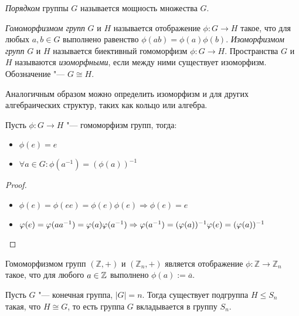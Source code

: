 \begin{definition}
	\textit{Порядком} группы $G$ называется мощность множества $G$.
\end{definition}

\begin{definition}
	\textit{Гомоморфизмом групп} $G$ и $H$ называется отображение $\phi : G \rightarrow H$ такое, что для любых $a,b \in G$ выполнено равенство $\phi(ab) = \phi(a)\phi(b)$. \textit{Изоморфизмом групп} $G$ и $H$ называется биективный гомоморфизм $\phi : G \rightarrow H$. Пространства $G$ и $H$ называются \textit{изоморфными}, если между ними существует изоморфизм. Обозначение "--- $G \cong H$.
\end{definition}

\begin{note}
	Аналогичным образом можно определить изоморфизм и для других алгебраических структур, таких как кольцо или алгебра.
\end{note}

\begin{proposition}
	Пусть $\phi: G \rightarrow H$ "--- гомоморфизм групп, тогда:
	\begin{itemize}
		\item $\phi(e) = e$
		\item $\forall a \in G: \phi(a^{-1}) = (\phi(a))^{-1}$
	\end{itemize}
\end{proposition}

\begin{proof}~
	\begin{itemize}
		\item $\phi(e) = \phi(ee) = \phi(e)\phi(e) \Rightarrow \phi(e) = e$
		\item $\phi(e) = \phi(aa^{-1}) = \phi(a)\phi(a^{-1}) \Rightarrow \phi(a^{-1}) = (\phi(a))^{-1}\phi(e) \hm{=} (\phi(a))^{-1}$\qedhere
	\end{itemize}
\end{proof}

\begin{example}
	Гомоморфизмом групп $(\mathbb{Z}, +)$ и $(\mathbb{Z}_n, +)$ является отображение $\phi: \mathbb{Z} \rightarrow \mathbb{Z}_n$ такое, что для любого $a \in \mathbb{Z}$ выполнено $\phi(a) := \overline{a}$.
\end{example}

\begin{theorem}[Кэли]
	Пусть $G$ "--- конечная группа, $|G| = n$. Тогда существует подгруппа $H \le S_n$ такая, что $H \cong G$, то есть группа $G$ вкладывается в группу $S_n$.
\end{theorem}

